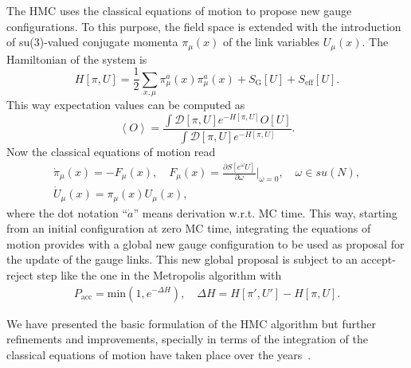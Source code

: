 The HMC uses the classical equations of motion to propose new gauge configurations. To this purpose, the field space is extended with the introduction of su(3)-valued conjugate momenta $\pi_{\mu}(x)$ of the link variables $U_{\mu}(x)$. The Hamiltonian of the system is
\begin{equation}
H[\pi,U]=\frac{1}{2}\sum_{x,\mu}\pi_{\mu}^a(x)\pi_{\mu}^a(x)+S_{\textrm{G}}[U]+S_{\textrm{eff}}[U].
\end{equation}
This way expectation values can be computed as
\begin{equation}
\left<O\right>=\frac{\int\mathcal{D}[\pi,U]e^{-H[\pi,U]}O[U]}{\int\mathcal{D}[\pi,U]e^{-H[\pi,U]}}.
\end{equation}
Now the classical equations of motion read
\begin{gather}
\dot{\pi}_{\mu}(x)=-F_{\mu}(x), \quad F_{\mu}(x)=\frac{\partial S[e^{\omega}U]}{\partial\omega}|_{\omega=0}, \quad \omega\in su(N), \\
\dot{U}_{\mu}(x)=\pi_{\mu}(x)U_{\mu}(x),
\end{gather}
where the dot notation ``$\dot{a}$'' means derivation w.r.t. MC time. This way, starting from an initial configuration at zero MC time, integrating the equations of motion provides with a global new gauge configuration to be used as proposal for the update of the gauge links. This new global proposal is subject to an accept-reject step like the one in the Metropolis algorithm with
\begin{gather}
P_{\textrm{acc}}=\textrm{min}\left(1,e^{-\Delta H}\right), \quad \Delta H=H[\pi',U']-H[\pi,U].
\end{gather}

We have presented the basic formulation of the HMC algorithm but further refinements and improvements, specially in terms of the integration of the classical equations of motion have taken place over the years~\citep{Weingarten:1991ra,OMELYAN2003272,Hasenbusch:2001ne}.

